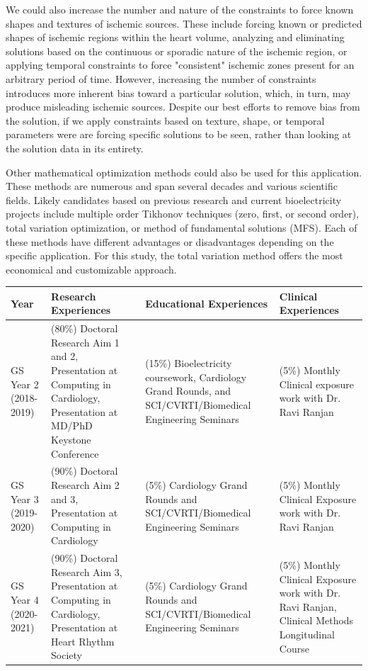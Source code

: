  We could also increase the number and nature of the constraints to force known
shapes and textures of ischemic sources. These include forcing known or predicted shapes of ischemic regions within the heart volume, analyzing and eliminating solutions based on the continuous or sporadic nature of the ischemic region, or applying temporal constraints to force "consistent" ischemic zones present for an arbitrary period of time. However, increasing the number of constraints introduces more inherent bias toward a particular solution, which, in turn, may produce misleading ischemic sources. Despite our best efforts to remove bias from the solution, if we apply constraints based on texture, shape, or temporal parameters were are forcing specific solutions to be seen, rather than looking at the solution data in its entirety. 

Other mathematical optimization methods could also be used for this application\cite{RSM:Ahm94,RSM:Bro96b,RSM:Ahm98,RSM:Gha2001,RSM:Ost92,RSM:Ost97c,RSM:Ram2003,RSM:Clu2018}. These methods are numerous and span several decades and various scientific fields. Likely candidates based on previous research and current bioelectricity projects include multiple order Tikhonov techniques (zero, first, or second order), total variation optimization, or method of fundamental solutions (MFS). Each of these methods have different advantages or disadvantages depending on the specific application. For this study, the total variation method offers the most economical and customizable approach. 

\begin{tabularx}{7.5in}{p{2.2cm}XXX}
	\hline 
	\hline
	\textbf{Year} & \textbf{Research Experiences} & \textbf{Educational Experiences} & \textbf{Clinical Experiences} \\ 
	\hline 
	\hline
	GS Year 2 \newline (2018-2019)& (80\%) Doctoral Research Aim 1 and 2, Presentation at Computing in Cardiology, Presentation at MD/PhD Keystone Conference  & (15\%) Bioelectricity coursework, Cardiology Grand Rounds, and SCI/CVRTI/Biomedical Engineering Seminars & (5\%) Monthly Clinical exposure work with Dr. Ravi Ranjan \\ 
	\hline 
	GS Year 3 \newline (2019-2020)& (90\%) Doctoral Research Aim 2 and 3, Presentation at Computing in Cardiology & (5\%) Cardiology Grand Rounds and SCI/CVRTI/Biomedical Engineering Seminars & (5\%) Monthly Clinical Exposure work with Dr. Ravi Ranjan \\
	\hline 
	GS Year 4 \newline (2020-2021)& (90\%) Doctoral Research Aim 3, Presentation at Computing in Cardiology, Presentation at Heart Rhythm Society& (5\%) Cardiology Grand Rounds and SCI/CVRTI/Biomedical Engineering Seminars & (5\%) Monthly Clinical Exposure work with Dr. Ravi Ranjan, Clinical Methods Longitudinal Course 
	\\
	\hline 
\end{tabularx} 



